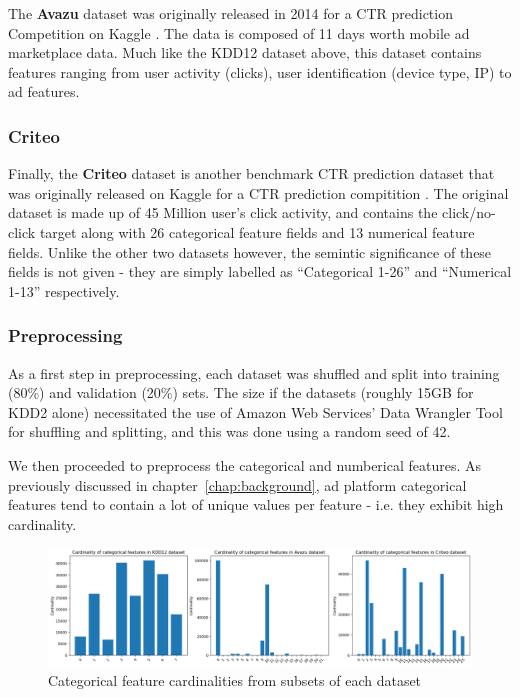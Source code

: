 \documentclass{mldsmsc}
\begin{document}
The \textbf{Avazu} dataset was originally released in 2014 for a CTR prediction 
Competition on Kaggle \citep{RefWorks:wang2014click-through}. The data is 
composed of 11 days worth mobile ad marketplace data. Much like the KDD12 
dataset above, this dataset contains features ranging from user activity 
(clicks), user identification (device type, IP) to ad features.

\subsubsection{Criteo}

Finally, the \textbf{Criteo} dataset is another benchmark CTR prediction dataset 
that was originally released on Kaggle for a CTR prediction compitition \citep{RefWorks:tien2014display}. 
The original dataset is made up of 45 Million user's click activity, and 
contains the click/no-click target along with 26 categorical feature 
fields and 13 numerical feature fields. Unlike the other two datasets 
however, the semintic significance of these fields is not given - they 
are simply labelled as ``Categorical 1-26'' and ``Numerical 1-13'' 
respectively.

\subsubsection{Preprocessing}

As a first step in preprocessing, each dataset was shuffled and split into training (80\%) and validation (20\%)
sets. The size if the datasets (roughly 15GB for KDD2 alone) necessitated the use of Amazon Web Services'
Data Wrangler Tool \citep{AWSDataWrangler} for shuffling and splitting, and this was done using a random seed of 42.

We then proceeded to preprocess the categorical and numberical features. As previously
discussed in chapter~\ref{chap:background}, ad platform categorical features tend to contain
a lot of unique values per feature - i.e. they exhibit high cardinality.

\begin{figure}[h]
    \centering
    \includegraphics[width=\textwidth]{../figures/dataset_cardinalities.png}
    \caption{Categorical feature cardinalities from subsets of each dataset}
    \label{fig:cardinalities}
\end{figure}
\end{document}

